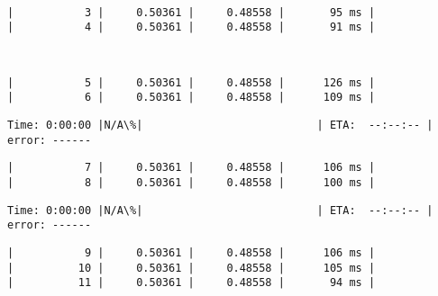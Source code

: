\documentclass[11pt]{article}
\begin{document}
    \begin{Verbatim}[commandchars=\\\{\}]
                                                                               

    \end{Verbatim}

    \begin{Verbatim}[commandchars=\\\{\}]
|           3 |     0.50361 |     0.48558 |       95 ms |
|           4 |     0.50361 |     0.48558 |       91 ms |

    \end{Verbatim}

    \begin{Verbatim}[commandchars=\\\{\}]
                                                                               

    \end{Verbatim}

    \begin{Verbatim}[commandchars=\\\{\}]
|           5 |     0.50361 |     0.48558 |      126 ms |
|           6 |     0.50361 |     0.48558 |      109 ms |

    \end{Verbatim}

    \begin{Verbatim}[commandchars=\\\{\}]
Time: 0:00:00 |N/A\%|                           | ETA:  --:--:-- | error: ------
    \end{Verbatim}

    \begin{Verbatim}[commandchars=\\\{\}]
|           7 |     0.50361 |     0.48558 |      106 ms |
|           8 |     0.50361 |     0.48558 |      100 ms |

    \end{Verbatim}

    \begin{Verbatim}[commandchars=\\\{\}]
Time: 0:00:00 |N/A\%|                           | ETA:  --:--:-- | error: ------
    \end{Verbatim}

    \begin{Verbatim}[commandchars=\\\{\}]
|           9 |     0.50361 |     0.48558 |      106 ms |
|          10 |     0.50361 |     0.48558 |      105 ms |
|          11 |     0.50361 |     0.48558 |       94 ms |

    \end{Verbatim}
\end{document}
